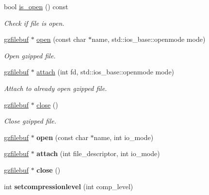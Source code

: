 \begin{DoxyCompactItemize}
bool \hyperlink{classgzfilebuf_a24dfb3e35c147aaf3a562c1ea4268757}{is\+\_\+open} () const
\begin{DoxyCompactList}\small\item\em Check if file is open. \end{DoxyCompactList}\item 
\hyperlink{classgzfilebuf}{gzfilebuf} $\ast$ \hyperlink{classgzfilebuf_a9582843a0caa22cb1b4ead1c687dabb2}{open} (const char $\ast$name, std\+::ios\+\_\+base\+::openmode mode)
\begin{DoxyCompactList}\small\item\em Open gzipped file. \end{DoxyCompactList}\item 
\hyperlink{classgzfilebuf}{gzfilebuf} $\ast$ \hyperlink{classgzfilebuf_ae8a47750ca65bc2a43b4768b47f3923a}{attach} (int fd, std\+::ios\+\_\+base\+::openmode mode)
\begin{DoxyCompactList}\small\item\em Attach to already open gzipped file. \end{DoxyCompactList}\item 
\hyperlink{classgzfilebuf}{gzfilebuf} $\ast$ \hyperlink{classgzfilebuf_a280d1c661fb371c22de1214d5a1682a2}{close} ()
\begin{DoxyCompactList}\small\item\em Close gzipped file. \end{DoxyCompactList}\item 
\mbox{\label{classgzfilebuf_aa9b7265991b457b25eb4928647298679}} 
\hyperlink{classgzfilebuf}{gzfilebuf} $\ast$ {\bfseries open} (const char $\ast$name, int io\+\_\+mode)
\item 
\mbox{\label{classgzfilebuf_a2668aaa74c4174e947e8751f652ddb03}} 
\hyperlink{classgzfilebuf}{gzfilebuf} $\ast$ {\bfseries attach} (int file\+\_\+descriptor, int io\+\_\+mode)
\item 
\mbox{\label{classgzfilebuf_a280d1c661fb371c22de1214d5a1682a2}} 
\hyperlink{classgzfilebuf}{gzfilebuf} $\ast$ {\bfseries close} ()
\item 
\mbox{\label{classgzfilebuf_a8bbfda3e29baf20e4330e3a9d7ee4a54}} 
int {\bfseries setcompressionlevel} (int comp\+\_\+level)
\item 
\mbox{\label{classgzfilebuf_a47d4b9f1257fd12dd21847b71ad1d49d}} 

\end{DoxyCompactItemize}
